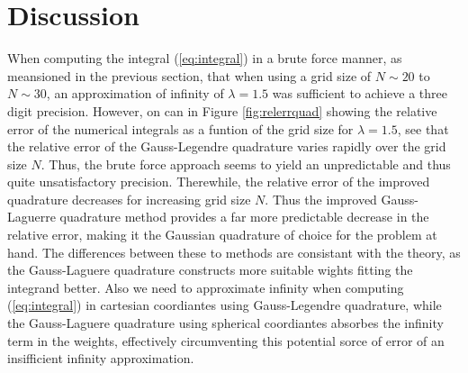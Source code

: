 \documentclass[10pt, twocolumn]{aastex62}
\begin{document}
\section{Discussion} \label{sec:discussion}
When computing the integral (\ref{eq:integral}) in a brute force manner, as
meansioned in the previous section, that when using a grid size of $N\sim20$ to
$N\sim30$, an approximation of infinity of $\lambda = 1.5$ was sufficient to
achieve a three digit precision. However, on can in Figure \ref{fig:relerrquad}
showing the relative error of the numerical integrals as a funtion of the grid
size for $\lambda = 1.5$, see that the relative error of the Gauss-Legendre
quadrature varies rapidly over the grid size $N$. Thus, the brute force approach
seems to yield an unpredictable and thus quite unsatisfactory precision.
Therewhile, the relative error of the improved quadrature decreases for
increasing grid size $N$. Thus the improved Gauss-Laguerre quadrature method
provides a far more predictable decrease in the relative error, making it the
Gaussian quadrature of choice for the problem at hand. The differences between
these to methods are consistant with the theory, as the Gauss-Laguere quadrature
constructs more suitable wights fitting the integrand better. Also we need to
approximate infinity when computing (\ref{eq:integral}) in cartesian coordiantes
using Gauss-Legendre quadrature, while the Gauss-Laguere quadrature using
spherical coordiantes absorbes the infinity term in the weights, effectively
circumventing this potential sorce of error of an insifficient infinity
approximation.\\\\\indent
\end{document}
